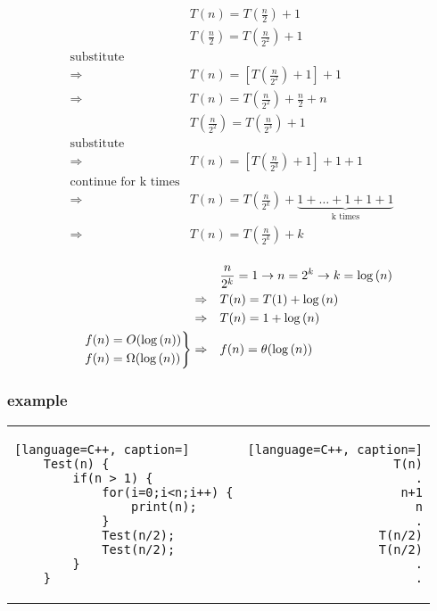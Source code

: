 \documentclass[12pt]{article}
\begin{document}
\begin{align*}
&T(n) = T(\frac{n}{2}) + 1 \\
&T(\frac{n}{2}) = T(\frac{n}{2^{2}}) + 1 \\
\text{substitute}& \\
\Rightarrow \quad &T(n) = [ T(\frac{n}{2^{2}}) + 1 ] + 1 \\
\Rightarrow \quad &T(n) = T(\frac{n}{2^{2}}) + \frac{n}{2}  + n \\
&T(\frac{n}{2^{2}}) = T(\frac{n}{2^{3}}) + 1 \\
\text{substitute} \\
\Rightarrow \quad &T(n) = [ T(\frac{n}{2^{3}}) + 1 ] + 1 + 1 \\
\text{continue for k times}& \\
\Rightarrow \quad &T(n) =  T(\frac{n}{2^{k}}) + \underbrace{1 + \dots + 1 + 1 + 1}_{\text{k times}} \\
\Rightarrow \quad &T(n) =  T(\frac{n}{2^{k}}) + k \\
\end{align*}






\begin{align*}
&\frac{n}{2^{k}} = 1 \to n = 2^{k} \to k = \log{(n)}  \\
\Rightarrow \quad &T(n) =  T(1) + \log{(n)} \\
\Rightarrow \quad &T(n) = 1 + \log{(n)} \\
\begin{rcases}
&f(n) = O(\log{(n)}) \\
&f(n) = \Omega(\log{(n)}) 
\end{rcases}
\Rightarrow \quad &f(n) = \theta(\log{(n)}) 
\end{align*}















\subsubsection{example}




\begin{center}
  \bgroup
  \def\arraystretch{1.5}%
  \begin{tabular}{ E  D  }
	\begin{lstlisting}[language=C++, caption=]
	Test(n) {
		if(n > 1) {
			for(i=0;i<n;i++) {
				print(n);
			}
			Test(n/2);
			Test(n/2);
		}
	}
	\end{lstlisting}
     &  
	\begin{lstlisting}[language=C++, caption=]
	T(n)
	.
	n+1
	n
	.
	T(n/2)
	T(n/2)
	.
	.
	\end{lstlisting}
  \end{tabular}
  \egroup
\end{center}
\end{document}
